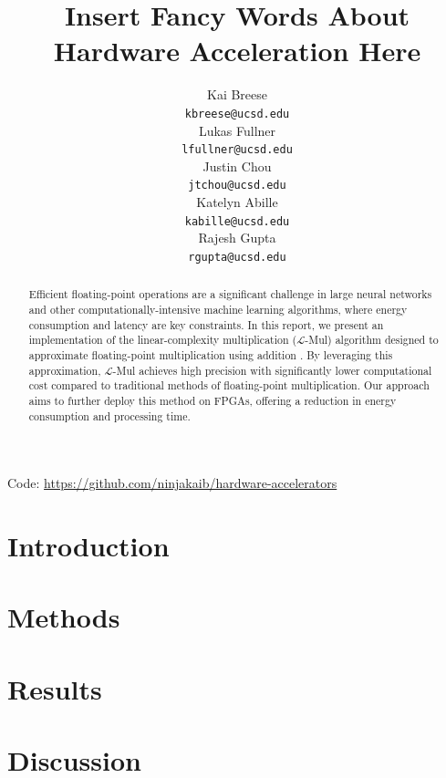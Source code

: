 \documentclass[12pt,letterpaper]{article}
\title{Insert Fancy Words About Hardware Acceleration Here}
\author{Kai Breese \\
  {\tt kbreese@ucsd.edu} \\\And
  Lukas Fullner \\
  {\tt lfullner@ucsd.edu} \\\And
  Justin Chou \\
  {\tt jtchou@ucsd.edu} \\\And
  Katelyn Abille \\
  {\tt kabille@ucsd.edu} \\\And
  Rajesh Gupta \\
  {\tt rgupta@ucsd.edu} \\}
\newcommand{\lmul}{$\mathcal{L}$-Mul\xspace}
\begin{document}
\maketitle


\begin{abstract}
    Efficient floating-point operations are a significant challenge in large neural networks and other computationally-intensive machine learning algorithms, where energy consumption and latency are key constraints. In this report, we present an implementation of the linear-complexity multiplication (\lmul) algorithm designed to approximate floating-point multiplication using addition \citep{luo2024addition}. By leveraging this approximation, \lmul achieves high precision with significantly lower computational cost compared to traditional methods of floating-point multiplication. Our approach aims to further deploy this method on FPGAs, offering a reduction in energy consumption and processing time. 
\end{abstract}

\begin{center}
Code: \url{https://github.com/ninjakaib/hardware-accelerators}
\end{center}

\maketoc
\clearpage


\section{Introduction}

\section{Methods}

\section{Results}

\section{Discussion}
\end{document}
